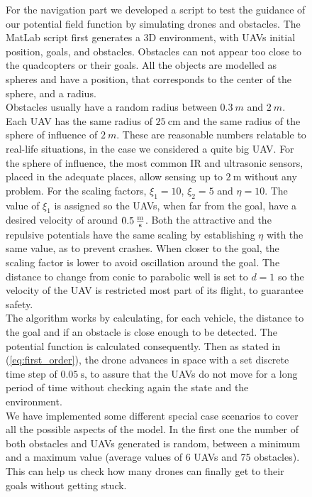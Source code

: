 \documentclass[journal]{IEEEtran}
\newcommand*{\subb}[1]{_{\mathrm{#1}}}
\begin{document}
		\begin{figure}[H]


	
	For the navigation part we developed a script to test the guidance of our potential field function by simulating drones and obstacles. The MatLab script first generates a 3D environment, with UAVs initial position, goals, and obstacles. Obstacles can not appear too close to the quadcopters or their goals. All the objects are modelled as spheres and have a position, that corresponds to the center of the sphere, and a radius.\\
	
	Obstacles usually have a random radius between $\SI{0.3}{m}$ and $\SI{2}{m}$. Each UAV has the same radius of $\SI{25}{\centi\meter}$ and the same radius of the sphere of influence of $\SI{2}{m}$. These are reasonable numbers relatable to real-life situations, in the case we considered a quite big UAV. For the sphere of influence, the most common IR and ultrasonic sensors, placed in the adequate places, allow sensing up to $\SI{2}{\meter}$ without any problem. For the scaling factors, $\xi\subb{1} = 10$, $\xi\subb{2} = 5$ and $\eta = 10$. The value of $\xi\subb{1}$ is assigned so the UAVs, when far from the goal, have a desired velocity of around $\SI{0.5}{\frac{\meter}{\second}}$. Both the attractive and the repulsive potentials have the same scaling by establishing $\eta$ with the same value, as to prevent crashes. When closer to the goal, the scaling factor is lower to avoid oscillation around the goal. The distance to change from conic to parabolic well is set to $d = 1$ so the velocity of the UAV is restricted most part of its flight, to guarantee safety.\\
	
	The algorithm works by calculating, for each vehicle, the distance to the goal and if an obstacle is close enough to be detected. The potential function is calculated consequently. Then as stated in (\ref{eq:first_order}), the drone advances in space with a set discrete time step of $\SI{0.05}{\second}$, to assure that the UAVs do not move for a long period of time without checking again the state and the environment.\\
	
	We have implemented some different special case scenarios to cover all the possible aspects of the model. In the first one the number of both obstacles and UAVs generated is random, between a minimum and a maximum value (average values of 6 UAVs and 75 obstacles). This can help us check how many drones can finally get to their goals without getting stuck.


\end{figure}
\end{document}
